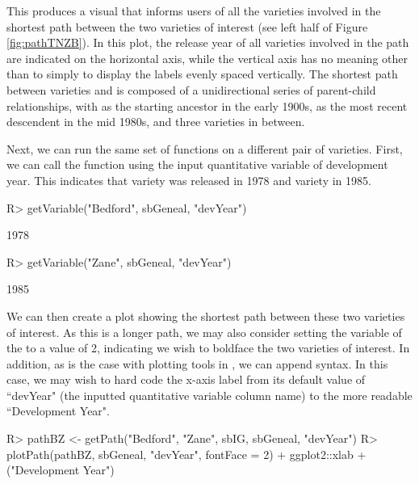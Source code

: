 \documentclass[article,shortnames]{jss}
\begin{document}
This produces a visual that informs users of all the varieties involved in the shortest path between the two varieties of interest (see left half of Figure \ref{fig:pathTNZB}). In this plot, the release year of all varieties involved in the path are indicated on the horizontal axis, while the vertical axis has no meaning other than to simply to display the labels evenly spaced vertically. The shortest path between varieties  and  is composed of a unidirectional series of parent-child relationships, with  as the starting ancestor in the early 1900s,  as the most recent descendent in the mid 1980s, and three varieties in between.

Next, we can run the same set of functions on a different pair of varieties. First, we can call the  function  using the input quantitative variable of development year. This indicates that variety  was released in 1978 and variety  in 1985.

\begin{CodeChunk}
\begin{CodeInput}
R> getVariable("Bedford", sbGeneal, "devYear")
\end{CodeInput}
\begin{CodeOutput}
[1] 1978
\end{CodeOutput}
\begin{CodeInput}
R> getVariable("Zane", sbGeneal, "devYear")
\end{CodeInput}
\begin{CodeOutput}
[1] 1985
\end{CodeOutput}
\end{CodeChunk}

We can then create a plot showing the shortest path between these two varieties of interest. As this is a longer path, we may also consider setting the  variable of the  to a value of 2, indicating we wish to boldface the two varieties of interest. In addition, as is the case with plotting tools in , we can append  syntax. In this case, we may wish to hard code the x-axis label from its default value of ``devYear" (the inputted quantitative variable column name) to the more readable ``Development Year".

\begin{Code}
R> pathBZ <- getPath("Bedford", "Zane", sbIG, sbGeneal, "devYear")
R> plotPath(pathBZ, sbGeneal, "devYear", fontFace = 2) + ggplot2::xlab
+    ("Development Year")
\end{Code}
\end{document}
